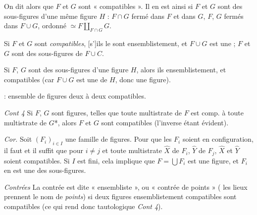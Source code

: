 \documentclass[11pt,a4paper]{article}
\begin{document}
On dit alors que $F$ et $G$ sont « \ill{} compatibles ». Il en est ainsi si $F$ et $G$ sont des sous-figures d'une même figure $H$ \ill{} : $F \cap G$ fermé dans $F$ et dans $G$, $F$, $G$ fermés dans $F \cup G$, \ill{} ordonné $\simeq F \amalg_{F \cap G} G$.

Si $F$ et $G$ sont \emph{compatibles}, [s']ils le sont ensemblistement, et $F \cup G$ est une \ill{} ; $F$ et $G$ sont des sous-figures de $F \cup C$.

Si $F$, $G$ sont des sous-figures d'une figure $H$, alors ils \ill{} ensemblistement, et compatibles (car $F \cup G$ est une \ill{} de $H$, donc une figure).

 : ensemble de figures deux à deux compatibles.


\emph{Cont 4} \quad Si $F$, $G$  sont  figures, telles que toute multistrate de $F$ est comp. à toute multistrate de $G$*, alors $F$ et $G$ sont compatibles (l'inverse étant évident).

 

\emph{Cor.} Soit $(F_i)_{i \in I}$ une famille \struck{\ill{}} de figures. Pour que les $F_i$ soient \ill{} en configuration, il faut et il suffit que pour $i \neq j$ et toute multistrate $\widehat{X}$ de $F_i$, $\widehat{Y}$ de $F_j$, $\widehat{X}$ et $\widehat{Y}$ soient compatibles. Si $I$ est fini, cela implique que $F = \bigcup F_i$ est une figure, et $F_i$ en est une des sous-figures.


\emph{Contrées  } \quad La contrée est dite « ensembliste », ou « contrée de points » ( les lieux prennent le nom de \emph{points}) si deux figures ensemblistement compatibles sont compatibles (ce qui rend donc tautologique \emph{Cont 4}).
\end{document}
